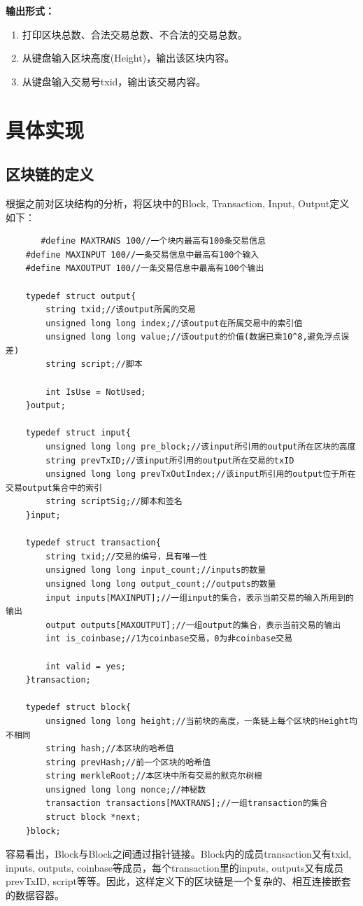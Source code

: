 \documentclass[10pt,a4paper]{article}
\begin{document}
    \noindent \textbf{输出形式：}
    \begin{enumerate}
        \item 打印区块总数、合法交易总数、不合法的交易总数。
        \item 从键盘输入区块高度(Height)，输出该区块内容。
        \item 从键盘输入交易号txid，输出该交易内容。
    \end{enumerate}
    \newpage
    \section{具体实现}
    \subsection{区块链的定义}
    根据之前对区块结构的分析，将区块中的Block, Transaction, Input, Output定义如下：
    \begin{verbatim}
	   #define MAXTRANS 100//一个块内最高有100条交易信息
    #define MAXINPUT 100//一条交易信息中最高有100个输入
    #define MAXOUTPUT 100//一条交易信息中最高有100个输出

    typedef struct output{
        string txid;//该output所属的交易
        unsigned long long index;//该output在所属交易中的索引值
        unsigned long long value;//该output的价值(数据已乘10^8,避免浮点误差)
        string script;//脚本

        int IsUse = NotUsed;
    }output;

    typedef struct input{
        unsigned long long pre_block;//该input所引用的output所在区块的高度
        string prevTxID;//该input所引用的output所在交易的txID
        unsigned long long prevTxOutIndex;//该input所引用的output位于所在交易output集合中的索引
        string scriptSig;//脚本和签名
    }input;

    typedef struct transaction{
        string txid;//交易的编号，具有唯一性
        unsigned long long input_count;//inputs的数量
        unsigned long long output_count;//outputs的数量
        input inputs[MAXINPUT];//一组input的集合，表示当前交易的输入所用到的输出
        output outputs[MAXOUTPUT];//一组output的集合，表示当前交易的输出
        int is_coinbase;//1为coinbase交易，0为非coinbase交易

        int valid = yes;
    }transaction;

    typedef struct block{
        unsigned long long height;//当前块的高度，一条链上每个区块的Height均不相同
        string hash;//本区块的哈希值
        string prevHash;//前一个区块的哈希值
        string merkleRoot;//本区块中所有交易的默克尔树根
        unsigned long long nonce;//神秘数
        transaction transactions[MAXTRANS];//一组transaction的集合
        struct block *next;
    }block;
	\end{verbatim}
    容易看出，Block与Block之间通过指针链接。Block内的成员transaction又有txid, inputs, outputs, coinbase等成员，每个transaction里的inputs, outputs又有成员prevTxID, script等等。因此，这样定义下的区块链是一个复杂的、相互连接嵌套的数据容器。
\end{document}
